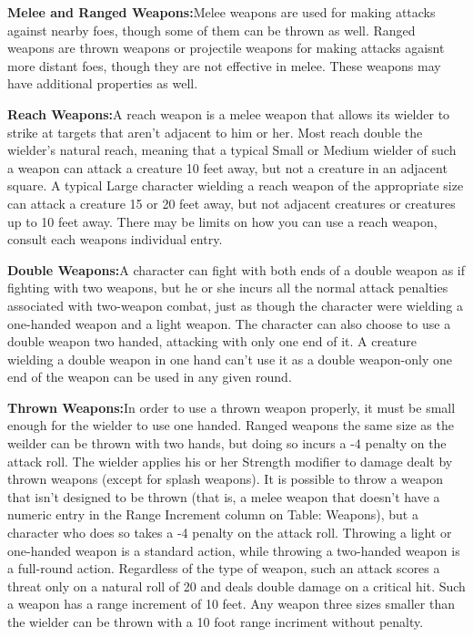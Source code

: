 {\noindent\textbf{Melee and Ranged Weapons:}{Melee weapons are used for making attacks against nearby foes, though some of them can be thrown as well. Ranged weapons are thrown weapons or projectile weapons for making attacks agaisnt more distant foes, though they are not effective in melee. These weapons may have additional properties as well.}

\noindent\textbf{Reach Weapons:}{A reach weapon is a melee weapon that allows its wielder to strike at targets that aren’t adjacent to him or her. Most reach double the wielder’s natural reach, meaning that a typical Small or Medium wielder of such a weapon can attack a creature 10 feet away, but not a creature in an adjacent square. A typical Large character wielding a reach weapon of the appropriate size can attack a creature 15 or 20 feet away, but not adjacent creatures or creatures up to 10 feet away. There may be limits on how you can use a reach weapon, consult each weapons individual entry.}

\noindent\textbf{Double Weapons:}{A character can fight with both ends of a double weapon as if fighting with two weapons, but he or she incurs all the normal attack penalties associated with two-weapon combat, just as though the character were wielding a one-handed weapon and a light weapon. The character can also choose to use a double weapon two handed, attacking with only one end of it. A creature wielding a double weapon in one hand can’t use it as a double weapon-only one end of the weapon can be used in any given round.}

\noindent\textbf{Thrown Weapons:}{In order to use a thrown weapon properly, it must be small enough for the wielder to use one handed. Ranged weapons the same size as the weilder can be thrown with two hands, but doing so incurs a -4 penalty on the attack roll. The wielder applies his or her Strength modifier to damage dealt by thrown weapons (except for splash weapons). It is possible to throw a weapon that isn’t designed to be thrown (that is, a melee weapon that doesn’t have a numeric entry in the Range Increment column on Table: Weapons), but a character who does so takes a -4 penalty on the attack roll. Throwing a light or one-handed weapon is a standard action, while throwing a two-handed weapon is a full-round action. Regardless of the type of weapon, such an attack scores a threat only on a natural roll of 20 and deals double damage on a critical hit. Such a weapon has a range increment of 10 feet. Any weapon three sizes smaller than the wielder can be thrown with a 10 foot range incriment without penalty.}

}
